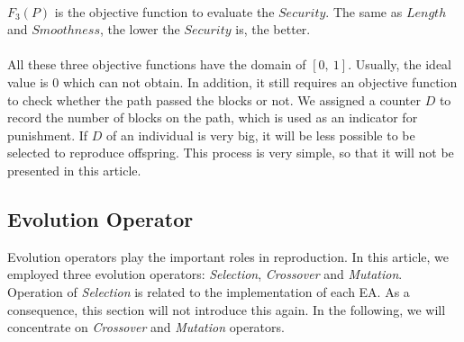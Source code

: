 \documentclass[a4paper, 11pt]{article}
\begin{document}
\\
$F_3(P)$ is the objective function to evaluate the $Security$. The same as $Length$ and $Smoothness$, the lower the $Security$ is, the better.\\
\\
All these three objective functions have the domain of $[0,\ 1]$. Usually, the ideal value is $0$ which can not obtain.
In addition, it still requires an objective function to check whether the path passed the blocks or not.
We assigned a counter $D$ to record the number of blocks on the path, which is used as an indicator for punishment.
If $D$ of an individual is very big, it will be less possible to be selected to reproduce offspring.
This process is very simple, so that it will not be presented in this article.

\subsection{Evolution Operator}
Evolution operators play the important roles in reproduction.
In this article, we employed three evolution operators: \emph{Selection},
\emph{Crossover} and \emph{Mutation}. Operation of \emph{Selection} is related to
the implementation of each EA. As a consequence, this section will not introduce this again. In the following, we will concentrate on \emph{Crossover} and \emph{Mutation} operators.
\end{document}
